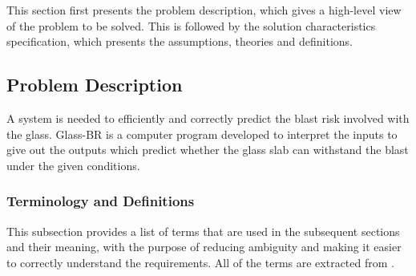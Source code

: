 \documentclass[12pt]{article}
\newcommand{\progname}{Glass-BR}
\begin{document}
This section first presents the problem description, which gives a high-level
view of the problem to be solved.  This is followed by the solution
characteristics specification, which presents the assumptions, theories and
definitions.

\subsection{Problem Description}

A system is needed to efficiently and correctly predict the blast risk involved
with the glass. \progname{} is a computer program developed to interpret the
inputs to give out the outputs which predict whether the glass slab can
withstand the blast under the given conditions.


\subsubsection{Terminology and  Definitions}

This subsection provides a list of terms that are used in the subsequent
sections and their meaning, with the purpose of reducing ambiguity and making it
easier to correctly understand the requirements.  All of the terms are extracted
from \cite{ASTM2009}.
\end{document}
